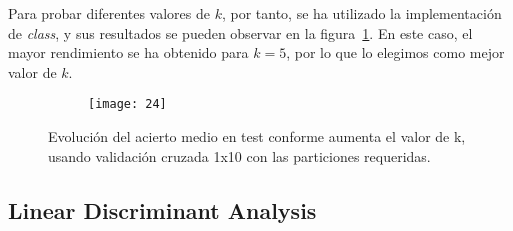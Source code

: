 \documentclass[a4paper, 11pt]{article}
\begin{document}
Para probar diferentes valores de $k$, por tanto, se ha utilizado la implementación de \textit{class}, y sus resultados se pueden observar en la figura~\ref{fig:classknn}. En este caso, el mayor rendimiento se ha obtenido para $k=5$, por lo que lo elegimos como mejor valor de $k$.

\begin{figure}[ht]
  \centering
  \begin{subfigure}{0.75\textwidth}
    \texttt{[image: 24]}
  \end{subfigure}
  \hfill
  \begin{subfigure}{0.19\textwidth}
  \end{subfigure}
  
  \caption{\label{fig:classknn}Evolución del acierto medio en test conforme aumenta el valor de k, usando validación cruzada 1x10 con las particiones requeridas.}
  
\end{figure}

\subsection{Linear Discriminant Analysis}
\end{document}
